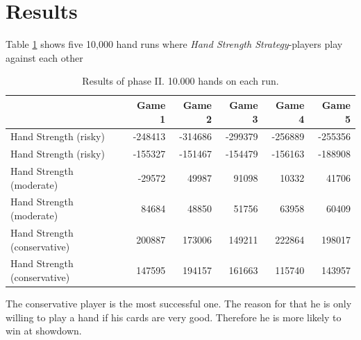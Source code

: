 \section{Results}
Table \ref{tbl:resultsPhase2a} shows five 10,000 hand runs where \emph{Hand Strength Strategy}-players play against each other
\begin{table}[h]
	\centering
	\begin{tabular}[h]{l|r|r|r|r|r}
		& \textbf{Game 1} & \textbf{Game 2} & \textbf{Game 3} & \textbf{Game 4} & \textbf{Game 5}\\
		\hline
		Hand Strength (risky) & -248413 & -314686 & -299379 & -256889 & -255356\\
		Hand Strength (risky) & -155327 & -151467 & -154479 & -156163 & -188908\\
		Hand Strength (moderate) & -29572 & 49987 & 91098 & 10332 & 41706\\
		Hand Strength (moderate) & 84684 & 48850 & 51756 & 63958 & 60409\\
		Hand Strength (conservative) & 200887 & 173006 & 149211 & 222864 & 198017\\
		Hand Strength (conservative) & 147595 & 194157 & 161663 & 115740 & 143957\\
	\end{tabular}
	\label{tbl:resultsPhase2a}
	\caption{Results of phase II. 10.000 hands on each run.}
\end{table}
The conservative player is the most successful one. The reason for that he is only willing to play  a hand if his cards are very good. Therefore he is more likely to win at showdown.

